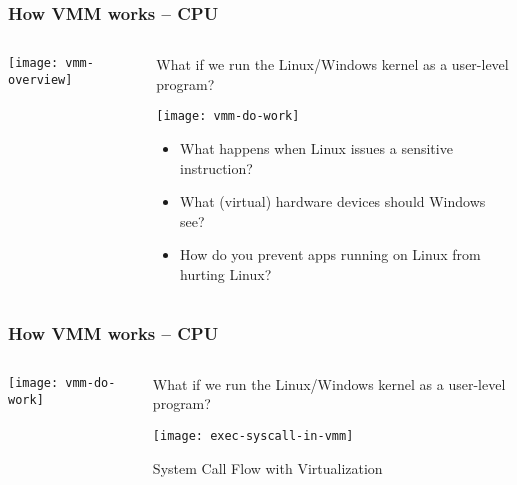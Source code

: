 \begin{frame}[plain]
	\frametitle{How VMM works -- CPU}
	
	
	
	\begin{columns}
		
		\begin{column}{.3\textwidth}
			
			\texttt{[image: vmm-overview]}
			
		\end{column}
		
		\begin{column}{.7\textwidth}
			
			What if we run the Linux/Windows kernel as a user-level program?	
			
			\centering
			\texttt{[image: vmm-do-work]}	
			
			\begin{itemize}
				\item What happens when Linux issues a sensitive instruction?
				\item What (virtual) hardware devices should Windows see?  
				\item How do you prevent apps running on Linux from hurting Linux?
				
			\end{itemize} 
			
		\end{column}
		
		
	\end{columns}
	
	
\end{frame}


\begin{frame}[plain]
	\frametitle{How VMM works  -- CPU}
	
	
	
	\begin{columns}
		
		\begin{column}{.3\textwidth}
			
			\texttt{[image: vmm-do-work]}
			
		\end{column}
		
		\begin{column}{.7\textwidth}
			
			What if we run the Linux/Windows kernel as a user-level program?	
			
			\centering
			\texttt{[image: exec-syscall-in-vmm]}	
			
			System Call Flow with Virtualization
			
			
		\end{column}
		
		
	\end{columns}
	
	
\end{frame}

